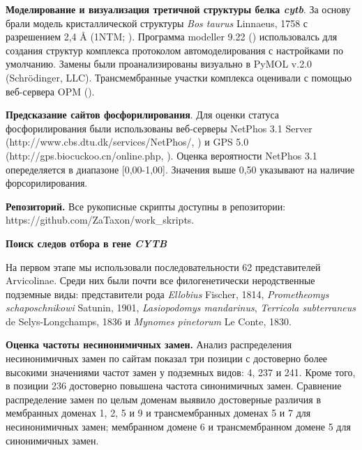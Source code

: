 \textbf{Моделирование и визуализация третичной структуры белка \textit{cytb}}. За основу брали модель кристаллической структуры  \textit{Bos taurus} Linnaeus, 1758 с разрешением 2,4 Å (1NTM; \cite{Gao2003}). Программа modeller 9.22 (\cite{Webb2016}) использовалсь для создания структур комплекса протоколом автомоделирования с настройками по умолчанию. Замены были проанализированы визуально в PyMOL v.2.0 (Schrödinger, LLC). Трансмембранные участки комплекса оценивали с помощью веб-сервера OPM (\cite{Lomize2012}). 


\textbf{Предсказание сайтов фосфорилирования}. Для оценки статуса фосфорилирования были использованы веб-серверы NetPhos 3.1 Server (http://www.cbs.dtu.dk/services/NetPhos/, \cite{Blom2004}) и GPS 5.0 (http://gps.biocuckoo.cn/online.php, \cite{Xue2011}). Оценка вероятности NetPhos 3.1 опеределяется в диапазоне [0,00-1,00]. Значения выше 0,50 указывают на наличие форсорилирования. 

\textbf{Репозиторий.} Все рукописные скрипты доступны в репозитории:  https://github.com/ZaTaxon/work\_skripts.

\vspace{3mm}

\hspace{-10mm}\textbf{\Large Поиск следов отбора в гене \textit{CYTB}}

\vspace{3mm}

На первом этапе мы использовали последовательности 62 представителей Arvicolinae. Среди них были почти все филогенетически неродственные подземные виды: представители рода \textit{Ellobius} Fischer, 1814, \textit{Prometheomys schaposchnikowi} Satunin, 1901, \textit{Lasiopodomys mandarinus}, \textit{Terricola subterraneus} de Selys-Longchamps, 1836 и \textit{Mynomes pinetorum} Le Conte, 1830.  

\textbf{Оценка частоты несинонимичных замен.} Анализ распределения несинонимичных замен по сайтам показал три позиции с достоверно более высокими значениями частот замен у подземных видов: 4, 237 и 241. Кроме того, в позиции 236 достоверно повышена частота синонимичных замен. Сравнение распределение замен по целым доменам выявило достоверные различия в мембранных доменах 1, 2, 5 и 9 и трансмембранных доменах 5 и 7 для несинонимичных замен; мембранном домене 6 и трансмембранном домене 5 для синонимичных замен.

